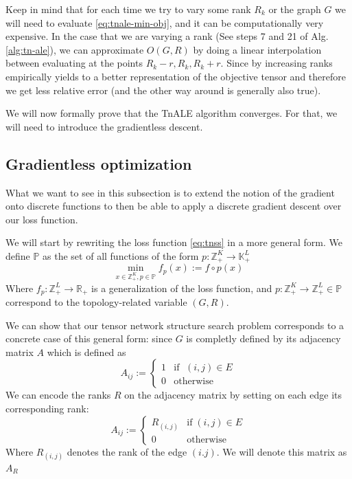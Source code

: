 \documentclass[11pt,a4paper,openright,oneside]{book}
\numberwithin{equation}{section}
\begin{document}
{Keep in mind that for each time we try to vary some rank $R_k$ or the graph $G$ we will need to evaluate \eqref{eq:tnale-min-obj}, and it 
can be computationally very expensive. In the case that we are varying a rank (See steps 7 and 21 of Alg. \ref{alg:tn-ale}), we can 
approximate $O(G, R)$ by doing a linear interpolation between evaluating at the points
$R_k - r, R_k, R_k + r$. Since by increasing ranks empirically yields 
to a better representation of the objective tensor \cite{liAlternatingLocalEnumeration2023} and therefore we get less relative error
(and the other way around is generally also true).

We will now formally prove that the \gls{TnALE} algorithm converges. For that, we will need to introduce the gradientless descent.

\subsection{Gradientless optimization}

What we want to see in this subsection is to extend the notion of the gradient onto 
discrete functions to then be able to apply a discrete gradient descent over our loss function.

We will start by rewriting the loss function \eqref{eq:tnss} in a more general form. We define $\mathbb{P}$ as the
set of all functions of the form $p : \mathbb{Z}_+^K \rightarrow \mathbb{K}_+^L$
\begin{equation}
\min_{x \in \mathbb{Z}_+^K, p \in \mathbb{P}} f_p(x) := f \circ p(x)
\label{eq:min_grad}
\end{equation}
Where $f_p : \mathbb{Z}_+^L \rightarrow \mathbb{R}_+$ is a generalization of the loss function, and $p : \mathbb{Z}_+^K \rightarrow \mathbb{Z}_+^L \in \mathbb{P}$
correspond to the topology-related variable $(G, R)$.

We can show that our tensor network structure search problem corresponds to a concrete case of this general form: since $G$ is completly defined by its adjacency matrix $A$ which is defined as
$$A_{ij} := \begin{cases}
    1 & \text{if }\;(i, j) \in E \\
    0 & \text{otherwise}
\end{cases}$$
We can encode the ranks $R$ on the adjacency matrix by setting on each edge its corresponding rank:
$$A_{ij} := \begin{cases}
    R_{(i,j)} & \text{if}\;(i, j) \in E \\
    0 & \text{otherwise}
\end{cases}$$
Where $R_{(i,j)}$ denotes the rank of the edge $(i.j)$. We will denote this matrix as $A_R$

}
\end{document}
